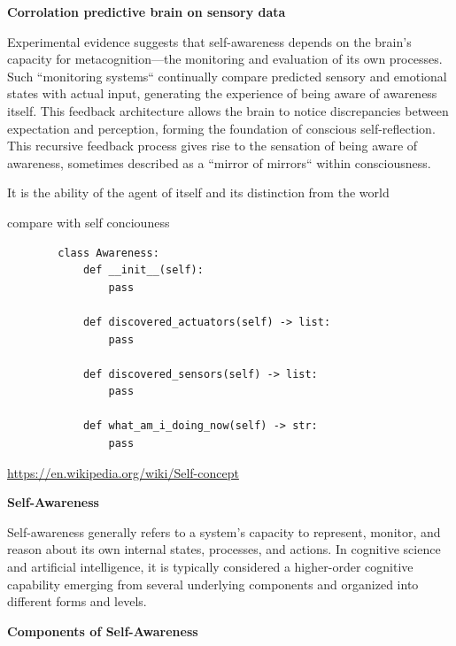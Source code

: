 \documentclass{book}
\providecommand{\ProjectDeepHeading}[2]{%
    \par\medskip\noindent\textbf{#2}\par\smallskip
}
\begin{document}
    \ProjectDeepHeading{6}{Corrolation predictive brain on sensory data}
    Experimental evidence suggests that self-awareness depends on the brain's capacity for metacognition—the monitoring and evaluation of its own processes. Such ``monitoring systems`` continually compare predicted sensory and emotional states with actual input, generating the experience of being aware of awareness itself. This feedback architecture allows the brain to notice discrepancies between expectation and perception, forming the foundation of conscious self-reflection. This recursive feedback process gives rise to the sensation of being aware of awareness, sometimes described as a ``mirror of mirrors`` within consciousness.\cite{garcia-2013-stuck-in-the-moment}


    
    It is the ability of the agent of itself and its distinction from the world
    
    compare with self conciouness
    \begin{verbatim}
        class Awareness:
            def __init__(self):
                pass
            
            def discovered_actuators(self) -> list:
                pass
            
            def discovered_sensors(self) -> list:
                pass
            
            def what_am_i_doing_now(self) -> str:
                pass
    \end{verbatim}


\url{https://en.wikipedia.org/wiki/Self-concept}


\ProjectDeepHeading{6}{Self-Awareness}
        
        Self-awareness generally refers to a system's capacity to represent, monitor, and reason about its own internal states, processes, and actions. In cognitive science and artificial intelligence, it is typically considered a higher-order cognitive capability emerging from several underlying components and organized into different forms and levels.
    
    
    \ProjectDeepHeading{6}{Components of Self-Awareness}
        
\end{document}
